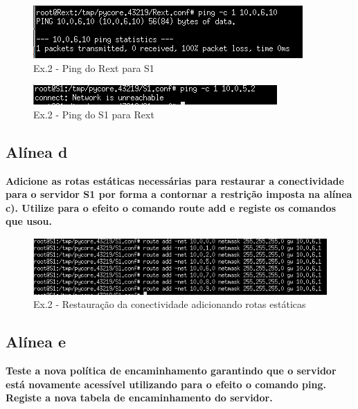 \documentclass[a4paper]{report}
\begin{document}
\begin{figure}[H]
    \centering 
    \includegraphics[width=\textwidth]{images/pingRextS1.png}
    \caption{Ex.2 - Ping do Rext para S1}
    \label{fig:pingRextS1}
\end{figure}

\begin{figure}[H]
    \centering 
    \includegraphics[width=\textwidth]{images/pingS1Rext.png}
    \caption{Ex.2 - Ping do S1 para Rext}
    \label{fig:pingS1Rext}
\end{figure}

\subsection{Alínea d}
\textbf{Adicione as rotas estáticas necessárias para restaurar a conectividade
para o servidor S1 por forma a contornar a restrição imposta na alínea c). Utilize
para o efeito o comando route add e registe os comandos que usou.}

\begin{figure}[H]
    \centering 
    \includegraphics[width=\textwidth]{images/routeAdd.png}
    \caption{Ex.2 - Restauração da conectividade adicionando rotas estáticas}
    \label{fig:routeAdd}
\end{figure}

\subsection{Alínea e}
\textbf{Teste a nova política de encaminhamento garantindo que o servidor está novamente
acessível utilizando para o efeito o comando ping. Registe a nova tabela de
encaminhamento do servidor.}
\end{document}
